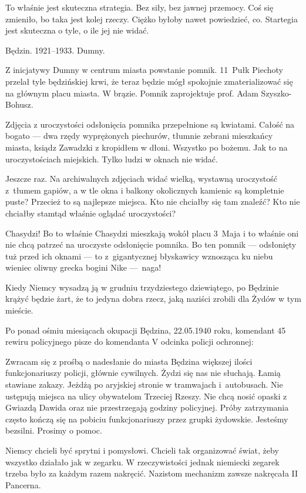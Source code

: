 \documentclass[11pt,a4paper,oneside]{article}
\begin{document}
To właśnie jest skuteczna strategia. Bez siły, bez jawnej przemocy.
Coś się zmieniło, bo taka jest kolej rzeczy.  Ciężko byłoby nawet
powiedzieć, co. Startegia jest skuteczna o tyle, o ile jej nie widać. 

Będzin. 1921--1933. Dumny.

Z inicjatywy Dumny  w centrum miasta powstanie pomnik.
11~Pułk Piechoty przelał tyle będzińskiej krwi, że teraz będzie mógł
spokojnie zmaterializować się na głównym placu miasta. W brązie.
Pomnik zaprojektuje prof. Adam Szyszko-Bohusz.

Zdjęcia z uroczystości odsłonięcia pomnika przepełnione są kwiatami.
Całość na bogato --- dwa rzędy wyprężonych piechurów, tłumnie zebrani
mieszkańcy miasta, ksiądz Zawadzki z kropidłem w dłoni.  Wszystko po
bożemu.  Jak to na uroczystościach miejskich.  Tylko ludzi w oknach
nie widać.

Jeszcze raz. Na archiwalnych zdjęciach widać wielką, wystawną
uroczystość z~tłumem gapiów, a w tle okna i balkony okolicznych
kamienic są kompletnie puste?  Przecież to są najlepsze miejsca. Kto
nie chciałby się tam znaleźć?  Kto nie chciałby stamtąd właśnie
oglądać uroczystości?

Chasydzi! Bo to właśnie Chasydzi mieszkają wokół placu 3~Maja i to
właśnie oni nie chcą patrzeć na uroczyste odsłonięcie pomnika. Bo ten
pomnik --- odsłonięty tuż przed ich oknami --- to z~gigantycznej błyskawicy
wznosząca ku niebu wieniec oliwny grecka bogini Nike ---~naga!

Kiedy Niemcy wysadzą ją w grudniu trzydziestego dziewiątego, po
Będzinie krążyć będzie żart, że to jedyna dobra rzecz, jaką naziści
zrobili dla Żydów w tym mieście.

Po ponad ośmiu miesiącach okupacji Będzina, 22.05.1940 roku, komendant
45 rewiru policyjnego pisze do komendanta V odcinka policji 
ochronnej:

Zwracam się z prośbą o nadesłanie do miasta Będzina większej ilości
funkcjonariuszy policji, głównie cywilnych.  Żydzi się nas nie
słuchają. Łamią stawiane zakazy. Jeżdżą po aryjskiej stronie
w tramwajach i~autobusach. Nie ustępują miejsca na ulicy obywatelom
Trzeciej Rzeszy. Nie chcą nosić opaski z Gwiazdą Dawida oraz nie
przestrzegają godziny policyjnej. Próby zatrzymania często kończą się
na pobiciu funkcjonariuszy przez grupki żydowskie.  Jesteśmy bezsilni.
Prosimy o pomoc.

Niemcy chcieli być sprytni i pomysłowi. Chcieli tak organizować świat,
żeby wszystko działało jak w zegarku. W rzeczywistości jednak
niemiecki zegarek trzeba było za każdym razem nakręcić. Nazistom
mechanizm zawsze nakręcała II Pancerna. 
\end{document}

